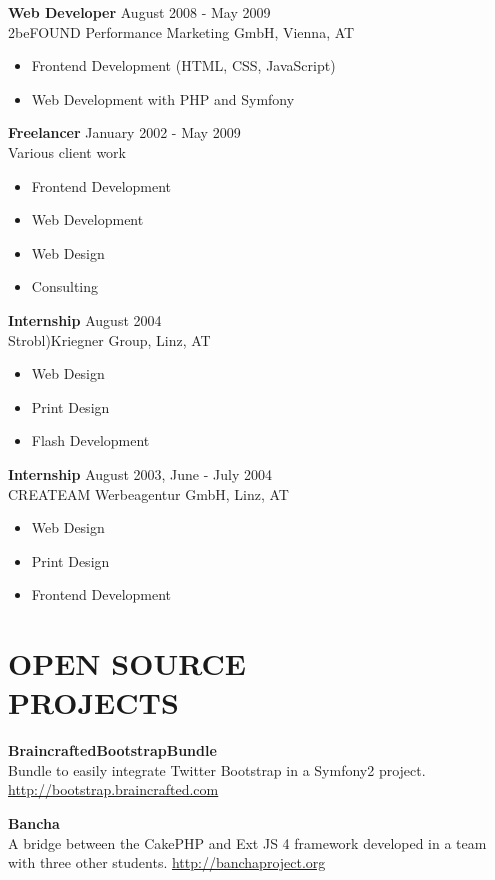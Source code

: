 \documentclass[margin]{res}
\begin{document}
\begin{resume}
\textbf{Web Developer} \hfill August 2008 - May 2009 \\
	2beFOUND Performance Marketing GmbH, Vienna, AT
	\begin{itemize}  \itemsep -2pt
		\item Frontend Development (HTML, CSS, JavaScript)
		\item Web Development with PHP and Symfony
	\end{itemize}

\textbf{Freelancer} \hfill January 2002 - May 2009 \\
	Various client work
	\begin{itemize}  \itemsep -2pt
		\item Frontend Development
		\item Web Development
		\item Web Design
		\item Consulting
	\end{itemize}

\textbf{Internship} \hfill August 2004 \\
	Strobl)Kriegner Group, Linz, AT
	\begin{itemize}  \itemsep -2pt
		\item Web Design
		\item Print Design
		\item Flash Development
	\end{itemize}

\textbf{Internship} \hfill August 2003, June - July 2004 \\
	CREATEAM Werbeagentur GmbH, Linz, AT
	\begin{itemize}  \itemsep -2pt
		\item Web Design
		\item Print Design
		\item Frontend Development
	\end{itemize}

\clearpage

\section{OPEN SOURCE \\ PROJECTS}

\textbf{BraincraftedBootstrapBundle} \\
	Bundle to easily integrate Twitter Bootstrap in a Symfony2 project. \url{http://bootstrap.braincrafted.com}

\textbf{Bancha} \\
	A bridge between the CakePHP and Ext JS 4 framework developed in a team with three other students. \url{http://banchaproject.org}


\end{resume}
\end{document}
